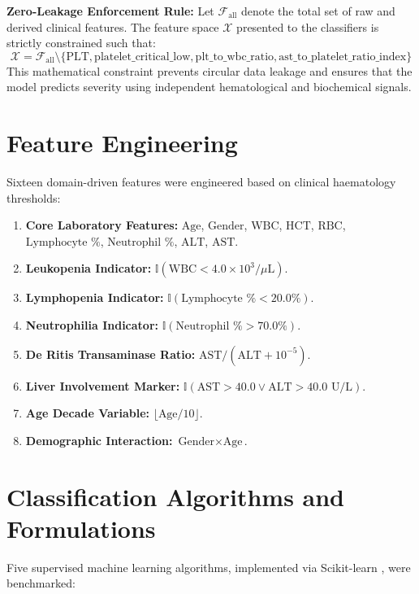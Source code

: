 \documentclass[12pt, a4paper]{report}
\begin{document}
\noindent
\textbf{Zero-Leakage Enforcement Rule:} Let $\mathcal{F}_{\text{all}}$ denote the total set of raw and derived clinical features. The feature space $\mathcal{X}$ presented to the classifiers is strictly constrained such that:
\begin{equation}
\mathcal{X} = \mathcal{F}_{\text{all}} \setminus \{\text{PLT}, \text{platelet\_critical\_low}, \text{plt\_to\_wbc\_ratio}, \text{ast\_to\_platelet\_ratio\_index}\}
\end{equation}
This mathematical constraint prevents circular data leakage and ensures that the model predicts severity using independent hematological and biochemical signals.

\section{Feature Engineering}
Sixteen domain-driven features were engineered based on clinical haematology thresholds:
\begin{enumerate}
    \item \textbf{Core Laboratory Features:} $\text{Age}$, $\text{Gender}$, $\text{WBC}$, $\text{HCT}$, $\text{RBC}$, $\text{Lymphocyte \%}$, $\text{Neutrophil \%}$, $\text{ALT}$, $\text{AST}$.
    \item \textbf{Leukopenia Indicator:} $\mathbb{I}(\text{WBC} < 4.0 \times 10^3/\mu\text{L})$.
    \item \textbf{Lymphopenia Indicator:} $\mathbb{I}(\text{Lymphocyte \%} < 20.0\%)$.
    \item \textbf{Neutrophilia Indicator:} $\mathbb{I}(\text{Neutrophil \%} > 70.0\%)$.
    \item \textbf{De Ritis Transaminase Ratio:} $\text{AST} / (\text{ALT} + 10^{-5})$.
    \item \textbf{Liver Involvement Marker:} $\mathbb{I}(\text{AST} > 40.0 \lor \text{ALT} > 40.0 \text{ U/L})$.
    \item \textbf{Age Decade Variable:} $\lfloor \text{Age} / 10 \rfloor$.
    \item \textbf{Demographic Interaction:} $\text{Gender} \times \text{Age}$.
\end{enumerate}

\section{Classification Algorithms and Formulations}
Five supervised machine learning algorithms, implemented via Scikit-learn \cite{pedregosa2011}, were benchmarked:
\end{document}
